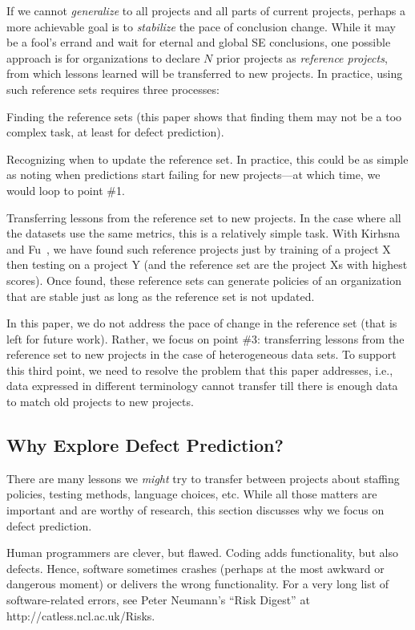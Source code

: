 If we cannot {\em generalize} to all projects and all parts
of current projects, perhaps a more achievable goal is to {\em stabilize} the pace of conclusion change. 
While it may be 
a fool's errand and wait for eternal and global SE
conclusions, one possible approach is for organizations
to declare $N$ prior projects as {\em reference projects},
from which lessons learned will be transferred to new projects.
In practice, using such reference sets requires three processes:
\squishlist
\item Finding the reference sets (this paper shows that finding
  them may not be a too complex task, at least for defect prediction).
  \item Recognizing when to update the reference set. In practice,
  this could be as simple as noting when predictions start failing for new projects---at which time, we would loop to point \#1.
\item Transferring
  lessons from the reference set to new projects.  
\squishend
In the case where all the datasets use the same metrics, this is a relatively
simple task. With Kirhsna and Fu~\cite{krishna16}, we have found such reference projects just by training of
a project X then testing on a project Y (and the reference set are the project Xs with highest scores).
Once found, these reference sets can generate policies of an organization that are 
stable just as long as the reference set is not updated.

In this paper, we do not address the pace of change in the reference set
(that is left for future work).
Rather, we focus on point \#3: transferring lessons from
the reference set to new projects in the case of heterogeneous data sets. To support this third point,
we need to resolve the problem
  that this paper addresses, i.e., data expressed in different terminology
  cannot transfer till there is enough data to match old projects to new projects.

 


\subsection{Why Explore Defect Prediction?}

There are many lessons we {\em might} try to transfer between projects
about staffing policies, testing methods, language choices, etc. While
all those matters are important and are worthy of research, this section
discusses why we focus on defect prediction.  

Human programmers are clever, but flawed. Coding  adds functionality, but also defects.
Hence, software sometimes crashes (perhaps at the most awkward or dangerous moment) or delivers
the wrong functionality. For a very long list of software-related errors,
see  Peter Neumann's ``Risk Digest'' at http://catless.ncl.ac.uk/Risks.

